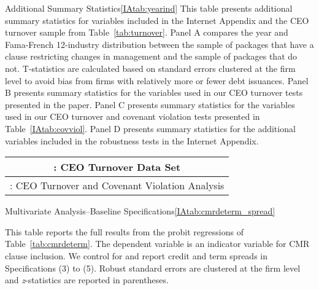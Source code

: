 \documentclass[12pt]{article}
\begin{document}
\begin{appendices}
\begin{singlespace}
\begin{papertable}{Additional Summary Statistics}{\ref{IAtab:yearind}}{}
    This table presents additional summary statistics for variables included in the Internet Appendix and the CEO turnover sample from Table~\ref{tab:turnover}.
    Panel A compares the year and Fama-French 12-industry distribution between the sample of packages that have a clause restricting changes in management and the sample of packages that do not.
    T-statistics are calculated based on standard errors clustered at the firm level to avoid bias from firms with relatively more or fewer debt issuances.
    Panel B presents summary statistics for the variables used in our CEO turnover tests presented in the paper.
    Panel C presents summary statistics for the variables used in our CEO turnover and covenant violation tests presented in Table~\ref{IAtab:covviol}.
    Panel D presents summary statistics for the additional variables included in the robustness tests in the Internet Appendix.

    \startdata
    
    \splittable
    {
    \begin{tabular}{l*{4}{c}}
    \toprule
    \multicolumn{5}{c}{\small \centering {Panel B}: CEO Turnover Data Set} \\ \midrule
    
    \midrule
    \multicolumn{5}{c}{\small \centering {Panel C}: CEO Turnover and Covenant Violation Analysis} \\
    \midrule
    
    \bottomrule
    \end{tabular}
    }
    \splittable
    
\end{papertable}


\begin{papertable}{Multivariate Analysis--Baseline Specifications}{\ref{IAtab:cmrdeterm_spread}}{} \label{IAtab:cmrdeterm_spread}

    This table reports the full results from the probit regressions of Table~\ref{tab:cmrdeterm}.
    The dependent variable is an indicator variable for CMR clause inclusion.
    We control for and report credit and term spreads in Specifications (3) to (5).
    Robust standard errors are clustered at the firm level and \textit{z}-statistics are reported in parentheses.
    \postamble

    \startdata
    
\end{papertable}



\end{singlespace}
\end{appendices}
\end{document}
